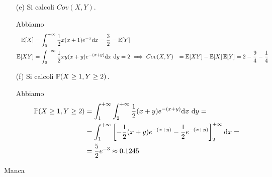 \begin{enumerate}
\item [(e)] Si calcoli $Cov(X,Y)$.

Abbiamo
\begin{gather*}
\begin{aligned}
\mathbb{E}[X]&=\int_{0}^{+\infty} \frac{1}{2}x(x+1)e^{-x}\mathrm{d} x=\frac{3}{2}=\mathbb{E}[Y] \\
\mathbb{E}[XY]&=\int_{0}^{+\infty} \frac{1}{2}xy(x+y)e^{-(x+y)}\mathrm{d} x\ \mathrm{d} y=2
\implies Cov(X,Y)&=\mathbb{E}[XY]-\mathbb{E}[X]\,\mathbb{E}[Y]=2-\frac{9}{4}-\frac{1}{4}
\end{aligned}
\end{gather*}

\item [(f)] Si calcoli $\mathbb{P}(X\geq 1,Y\geq 2)$.

Abbiamo
\begin{gather*}
\begin{aligned}
\mathbb{P}(X\geq 1,Y\geq 2)&=\int_1^{+\infty}\int_2^{+\infty} \frac{1}{2}(x+y)e^{-(x+y)}\mathrm{d} x\ \mathrm{d} y=\\
&=\int_1^{+\infty}\left[-\frac{1}{2}(x+y)e^{-(x+y)}-\frac{1}{2}e^{-(x+y)}  \right]_2^{+\infty}\mathrm{d} x=\\
&=\frac{5}{2}e^{-3}\approx 0.1245
\end{aligned}
\end{gather*}

\end{enumerate}

\Soluzione{}
Manca

